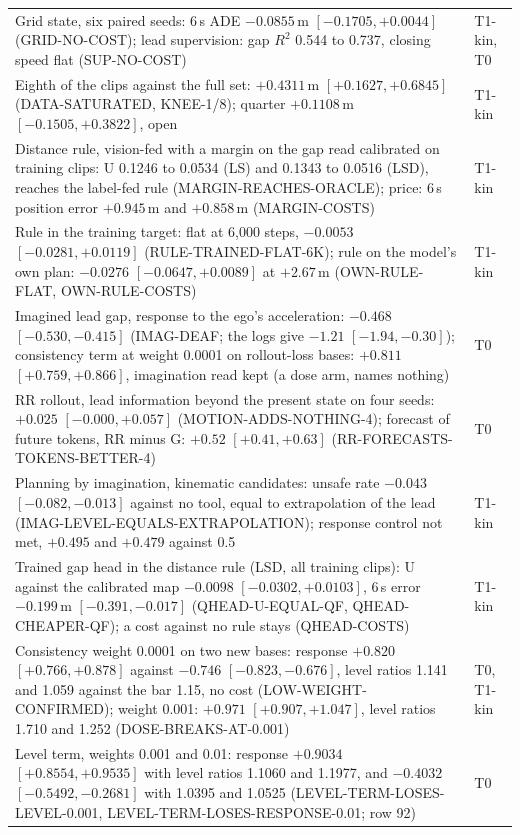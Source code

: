\documentclass[10pt,twocolumn]{article}
\theoremstyle{remark}
\begin{document}
\begin{table}[!tp]
\begin{tabularx}{\columnwidth}{@{}>{\raggedright\arraybackslash}Xl@{}}
Grid state, six paired seeds: 6\,s ADE $-0.0855$\,m $[-0.1705,+0.0044]$ (GRID-NO-COST); lead supervision: gap $R^2$ 0.544 to 0.737, closing speed flat (SUP-NO-COST) & T1-kin, T0 \\
Eighth of the clips against the full set: $+0.4311$\,m $[+0.1627,+0.6845]$ (DATA-SATURATED, KNEE-1/8); quarter $+0.1108$\,m $[-0.1505,+0.3822]$, open & T1-kin \\
Distance rule, vision-fed with a margin on the gap read calibrated on training clips: U 0.1246 to 0.0534 (LS) and 0.1343 to 0.0516 (LSD), reaches the label-fed rule (MARGIN-REACHES-ORACLE); price: 6\,s position error $+0.945$\,m and $+0.858$\,m (MARGIN-COSTS) & T1-kin \\
Rule in the training target: flat at 6,000 steps, $-0.0053$ $[-0.0281,+0.0119]$ (RULE-TRAINED-FLAT-6K); rule on the model's own plan: $-0.0276$ $[-0.0647,+0.0089]$ at $+2.67$\,m (OWN-RULE-FLAT, OWN-RULE-COSTS) & T1-kin \\
Imagined lead gap, response to the ego's acceleration: $-0.468$ $[-0.530,-0.415]$ (IMAG-DEAF; the logs give $-1.21$ $[-1.94,-0.30]$); consistency term at weight 0.0001 on rollout-loss bases: $+0.811$ $[+0.759,+0.866]$, imagination read kept (a dose arm, names nothing) & T0 \\
RR rollout, lead information beyond the present state on four seeds: $+0.025$ $[-0.000,+0.057]$ (MOTION-ADDS-NOTHING-4); forecast of future tokens, RR minus G: $+0.52$ $[+0.41,+0.63]$ (RR-FORECASTS-TOKENS-BETTER-4) & T0 \\
Planning by imagination, kinematic candidates: unsafe rate $-0.043$ $[-0.082,-0.013]$ against no tool, equal to extrapolation of the lead (IMAG-LEVEL-EQUALS-EXTRAPOLATION); response control not met, $+0.495$ and $+0.479$ against 0.5 & T1-kin \\
Trained gap head in the distance rule (LSD, all training clips): U against the calibrated map $-0.0098$ $[-0.0302,+0.0103]$, 6\,s error $-0.199$\,m $[-0.391,-0.017]$ (QHEAD-U-EQUAL-QF, QHEAD-CHEAPER-QF); a cost against no rule stays (QHEAD-COSTS) & T1-kin \\
Consistency weight 0.0001 on two new bases: response $+0.820$ $[+0.766,+0.878]$ against $-0.746$ $[-0.823,-0.676]$, level ratios 1.141 and 1.059 against the bar 1.15, no cost (LOW-WEIGHT-CONFIRMED); weight 0.001: $+0.971$ $[+0.907,+1.047]$, level ratios 1.710 and 1.252 (DOSE-BREAKS-AT-0.001) & T0, T1-kin \\
Level term, weights 0.001 and 0.01: response $+0.9034$ $[+0.8554,+0.9535]$ with level ratios 1.1060 and 1.1977, and $-0.4032$ $[-0.5492,-0.2681]$ with 1.0395 and 1.0525 (LEVEL-TERM-LOSES-LEVEL-0.001, LEVEL-TERM-LOSES-RESPONSE-0.01; row 92) & T0 \\

\end{tabularx}
\end{table}
\end{document}
